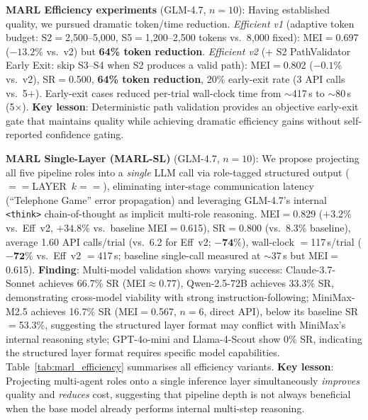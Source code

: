 \documentclass{article}
\begin{document}
\textbf{MARL Efficiency experiments} (GLM-4.7, $n{=}10$): Having established quality, we pursued dramatic token/time reduction.
\emph{Efficient v1} (adaptive token budget: S2$=$2{,}500--5{,}000, S5$=$1{,}200--2{,}500 tokens vs.\ 8{,}000 fixed): MEI$=$0.697 ($-13.2$\% vs.\ v2) but \textbf{64\% token reduction}.
\emph{Efficient v2} (+ S2 PathValidator Early Exit: skip S3--S4 when S2 produces a valid path): MEI$=$0.802 ($-0.1$\% vs.\ v2), SR$=$0.500, \textbf{64\% token reduction}, 20\% early-exit rate (3 API calls vs.\ 5+).
Early-exit cases reduced per-trial wall-clock time from ${\sim}$417\,s to ${\sim}$80\,s (5$\times$).
\textbf{Key lesson}: Deterministic path validation provides an objective early-exit gate that maintains quality while achieving dramatic efficiency gains without self-reported confidence gating.

\textbf{MARL Single-Layer (MARL-SL)} (GLM-4.7, $n{=}10$): We propose projecting all five pipeline roles into a \emph{single} LLM call via role-tagged structured output ($==$LAYER~$k$$==$), eliminating inter-stage communication latency (``Telephone Game'' error propagation) and leveraging GLM-4.7's internal \texttt{<think>} chain-of-thought as implicit multi-role reasoning.
MEI$=$0.829 ($+3.2$\% vs.\ Eff~v2, $+34.8$\% vs.\ baseline MEI$=$0.615), SR$=$0.800 (vs.\ 8.3\% baseline), average 1.60 API calls/trial (vs.\ 6.2 for Eff~v2; $\mathbf{-74\%}$), wall-clock $=$117\,s/trial ($\mathbf{-72\%}$ vs.\ Eff~v2 $=$417\,s; baseline single-call measured at ${\sim}$37\,s but MEI$=$0.615).
\textbf{Finding}: Multi-model validation shows varying success: Claude-3.7-Sonnet achieves 66.7\% SR (MEI$\approx$0.77), Qwen-2.5-72B achieves 33.3\% SR, demonstrating cross-model viability with strong instruction-following; MiniMax-M2.5 achieves 16.7\% SR (MEI$=$0.567, $n{=}6$, direct API), below its baseline SR$=$53.3\%, suggesting the structured layer format may conflict with MiniMax's internal reasoning style; GPT-4o-mini and Llama-4-Scout show 0\% SR, indicating the structured layer format requires specific model capabilities.
Table~\ref{tab:marl_efficiency} summarises all efficiency variants.
\textbf{Key lesson}: Projecting multi-agent roles onto a single inference layer simultaneously \emph{improves} quality and \emph{reduces} cost, suggesting that pipeline depth is not always beneficial when the base model already performs internal multi-step reasoning.
\end{document}
